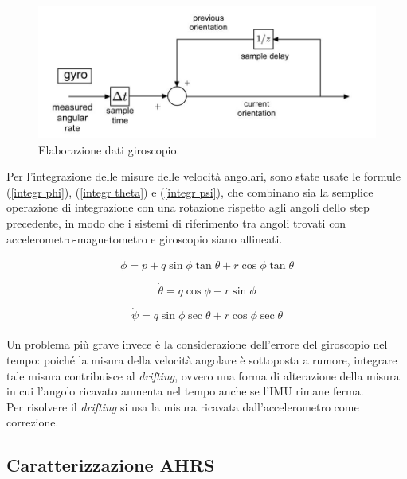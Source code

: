 \begin{figure}[H]
    \includegraphics[scale=0.35]{immagini/photo_2022-03-07_09-40-18.jpg}
    \centering
    \caption{Elaborazione dati giroscopio.}
\end{figure}

Per l'integrazione delle misure delle velocità angolari, sono state usate le formule (\ref{integr phi}), (\ref{integr theta}) e (\ref{integr psi}), che combinano sia la semplice operazione di integrazione con una rotazione rispetto agli angoli dello step precedente, in modo che i sistemi di riferimento tra angoli trovati con accelerometro-magnetometro e giroscopio siano allineati.

\begin{equation}\label{integr phi}
    \dot{\phi} = p + q \sin{\phi} \tan{\theta} + r \cos{\phi} \tan{\theta}
\end{equation}

\begin{equation}\label{integr theta}
    \dot{\theta} = q \cos{\phi} - r \sin{\phi}
\end{equation}

\begin{equation}\label{integr psi}
    \dot{\psi} = q \sin{\phi} \sec{\theta} + r \cos{\phi} \sec{\theta}
\end{equation}\\

Un problema più grave invece è la considerazione dell'errore del giroscopio nel tempo: poiché la misura della velocità angolare è sottoposta a rumore, integrare tale misura contribuisce al \textit{drifting}, ovvero una forma di alterazione della misura in cui l'angolo ricavato aumenta nel tempo anche se l'IMU rimane ferma.\\
Per risolvere il \textit{drifting} si usa la misura ricavata dall'accelerometro come correzione.

\clearpage

\subsection{Caratterizzazione AHRS}

